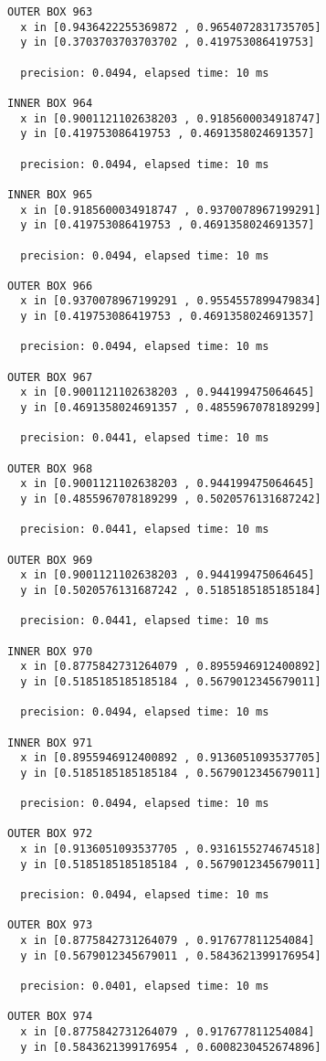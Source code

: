 \begin{verbatim}
OUTER BOX 963
  x in [0.9436422255369872 , 0.9654072831735705]
  y in [0.3703703703703702 , 0.419753086419753]

  precision: 0.0494, elapsed time: 10 ms

INNER BOX 964
  x in [0.9001121102638203 , 0.9185600034918747]
  y in [0.419753086419753 , 0.4691358024691357]

  precision: 0.0494, elapsed time: 10 ms

INNER BOX 965
  x in [0.9185600034918747 , 0.9370078967199291]
  y in [0.419753086419753 , 0.4691358024691357]

  precision: 0.0494, elapsed time: 10 ms

OUTER BOX 966
  x in [0.9370078967199291 , 0.9554557899479834]
  y in [0.419753086419753 , 0.4691358024691357]

  precision: 0.0494, elapsed time: 10 ms

OUTER BOX 967
  x in [0.9001121102638203 , 0.944199475064645]
  y in [0.4691358024691357 , 0.4855967078189299]

  precision: 0.0441, elapsed time: 10 ms

OUTER BOX 968
  x in [0.9001121102638203 , 0.944199475064645]
  y in [0.4855967078189299 , 0.5020576131687242]

  precision: 0.0441, elapsed time: 10 ms

OUTER BOX 969
  x in [0.9001121102638203 , 0.944199475064645]
  y in [0.5020576131687242 , 0.5185185185185184]

  precision: 0.0441, elapsed time: 10 ms

INNER BOX 970
  x in [0.8775842731264079 , 0.8955946912400892]
  y in [0.5185185185185184 , 0.5679012345679011]

  precision: 0.0494, elapsed time: 10 ms

INNER BOX 971
  x in [0.8955946912400892 , 0.9136051093537705]
  y in [0.5185185185185184 , 0.5679012345679011]

  precision: 0.0494, elapsed time: 10 ms

OUTER BOX 972
  x in [0.9136051093537705 , 0.9316155274674518]
  y in [0.5185185185185184 , 0.5679012345679011]

  precision: 0.0494, elapsed time: 10 ms

OUTER BOX 973
  x in [0.8775842731264079 , 0.917677811254084]
  y in [0.5679012345679011 , 0.5843621399176954]

  precision: 0.0401, elapsed time: 10 ms

OUTER BOX 974
  x in [0.8775842731264079 , 0.917677811254084]
  y in [0.5843621399176954 , 0.6008230452674896]


\end{verbatim}
